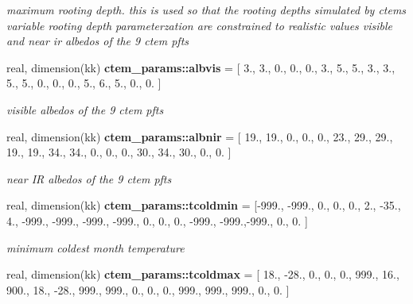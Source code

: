 \begin{DoxyCompactItemize}
\begin{DoxyCompactList}\small\item\em maximum rooting depth. this is used so that the rooting depths simulated by ctem\textquotesingle{}s variable rooting depth parameterzation are constrained to realistic values visible and near ir albedos of the 9 ctem pfts \end{DoxyCompactList}\item 
\hypertarget{namespacectem__params_a31818df48fa008f61e322e702577c978}{}real, dimension(kk) {\bfseries ctem\+\_\+params\+::albvis} = \mbox{[} 3., 3., 0., 0., 0., 3., 5., 5., 3., 3., 5., 5., 0., 0., 0., 5., 6., 5., 0., 0. \mbox{]}\label{namespacectem__params_a31818df48fa008f61e322e702577c978}

\begin{DoxyCompactList}\small\item\em visible albedos of the 9 ctem pfts \end{DoxyCompactList}\item 
\hypertarget{namespacectem__params_a40fb68ad0ca75f0de54aa2ced6257788}{}real, dimension(kk) {\bfseries ctem\+\_\+params\+::albnir} = \mbox{[} 19., 19., 0., 0., 0., 23., 29., 29., 19., 19., 34., 34., 0., 0., 0., 30., 34., 30., 0., 0. \mbox{]}\label{namespacectem__params_a40fb68ad0ca75f0de54aa2ced6257788}

\begin{DoxyCompactList}\small\item\em near I\+R albedos of the 9 ctem pfts \end{DoxyCompactList}\item 
\hypertarget{namespacectem__params_aa39eead45599d5797ad7bd80168fb657}{}real, dimension(kk) {\bfseries ctem\+\_\+params\+::tcoldmin} = \mbox{[}-\/999., -\/999., 0., 0., 0., 2., -\/35., 4., -\/999., -\/999., -\/999., -\/999., 0., 0., 0., -\/999., -\/999.,-\/999., 0., 0. \mbox{]}\label{namespacectem__params_aa39eead45599d5797ad7bd80168fb657}

\begin{DoxyCompactList}\small\item\em minimum coldest month temperature \end{DoxyCompactList}\item 
\hypertarget{namespacectem__params_a931982e7bbae83e4ebc020aef5e82785}{}real, dimension(kk) {\bfseries ctem\+\_\+params\+::tcoldmax} = \mbox{[} 18., -\/28., 0., 0., 0., 999., 16., 900., 18., -\/28., 999., 999., 0., 0., 0., 999., 999., 999., 0., 0. \mbox{]}\label{namespacectem__params_a931982e7bbae83e4ebc020aef5e82785}


\end{DoxyCompactItemize}
